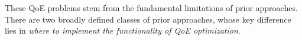 
These QoE problems stem from the fundamental limitations of prior 
approaches. There are two broadly defined classes of prior approaches,
whose key difference lies in
{\em where to implement the functionality of QoE optimization}.



